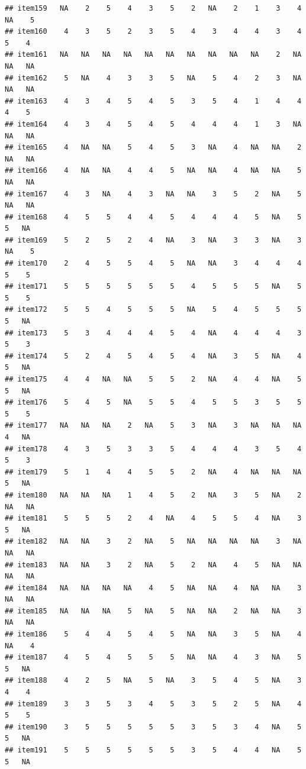 \documentclass[
  man]{apa6}
\begin{document}
\begin{verbatim}
## item159   NA    2    5    4    3    5    2   NA    2    1    3    4   NA    5
## item160    4    3    5    2    3    5    4    3    4    4    3    4    5    4
## item161   NA   NA   NA   NA   NA   NA   NA   NA   NA   NA    2   NA   NA   NA
## item162    5   NA    4    3    3    5   NA    5    4    2    3   NA   NA   NA
## item163    4    3    4    5    4    5    3    5    4    1    4    4    4    5
## item164    4    3    4    5    4    5    4    4    4    1    3   NA   NA   NA
## item165    4   NA   NA    5    4    5    3   NA    4   NA   NA    2   NA   NA
## item166    4   NA   NA    4    4    5   NA   NA    4   NA   NA    5   NA   NA
## item167    4    3   NA    4    3   NA   NA    3    5    2   NA    5   NA   NA
## item168    4    5    5    4    4    5    4    4    4    5   NA    5    5   NA
## item169    5    2    5    2    4   NA    3   NA    3    3   NA    3   NA    5
## item170    2    4    5    5    4    5   NA   NA    3    4    4    4    5    5
## item171    5    5    5    5    5    5    4    5    5    5   NA    5    5    5
## item172    5    5    4    5    5    5   NA    5    4    5    5    5    5   NA
## item173    5    3    4    4    4    5    4   NA    4    4    4    3    5    3
## item174    5    2    4    5    4    5    4   NA    3    5   NA    4    5   NA
## item175    4    4   NA   NA    5    5    2   NA    4    4   NA    5    5   NA
## item176    5    4    5   NA    5    5    4    5    5    3    5    5    5    5
## item177   NA   NA   NA    2   NA    5    3   NA    3   NA   NA   NA    4   NA
## item178    4    3    5    3    3    5    4    4    4    3    5    4    5    3
## item179    5    1    4    4    5    5    2   NA    4   NA   NA   NA    5   NA
## item180   NA   NA   NA    1    4    5    2   NA    3    5   NA    2   NA   NA
## item181    5    5    5    2    4   NA    4    5    5    4   NA    3    5   NA
## item182   NA   NA    3    2   NA    5   NA   NA   NA   NA    3   NA   NA   NA
## item183   NA   NA    3    2   NA    5    2   NA    4    5   NA   NA   NA   NA
## item184   NA   NA   NA   NA    4    5   NA   NA    4   NA   NA    3   NA   NA
## item185   NA   NA   NA    5   NA    5   NA   NA    2   NA   NA    3   NA   NA
## item186    5    4    4    5    4    5   NA   NA    3    5   NA    4   NA    4
## item187    4    5    4    5    5    5   NA   NA    4    3   NA    5    5   NA
## item188    4    2    5   NA    5   NA    3    5    4    5   NA    3    4    4
## item189    3    3    5    3    4    5    3    5    2    5   NA    4    5    5
## item190    3    5    5    5    5    5    3    5    3    4   NA    5    5   NA
## item191    5    5    5    5    5    5    3    5    4    4   NA    5    5   NA

\end{verbatim}
\end{document}
